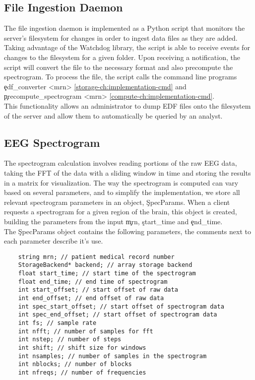 \subsection{File Ingestion Daemon}

The file ingestion daemon is implemented as a Python script that monitors the
server's filesystem for changes in order to ingest data files as they are
added. Taking advantage of the Watchdog \cite{watchdog} library, the script is
able to receive events for changes to the filesystem for a given folder. Upon
receiving a notification, the script will convert the file to the necessary
format and also precompute the spectrogram. To process the file, the script
calls the command line programs \c{edf\_converter <mrn>}
\ref{storage-ch:implementation-cmd} and \c{precompute\_spectrogram <mrn>}
\ref{compute-ch:implementation-cmd}. \\

This functionality allows an administrator to dump EDF files onto the
filesystem of the server and allow them to automatically be queried by an
analyst.

\subsection{EEG Spectrogram}\label{compute-ch:implementation-spectrogram}

The spectrogram calculation involves reading portions of the raw EEG data,
taking the FFT of the data with a sliding window in time and storing the
results in a matrix for visualization. The way the spectrogram is computed can
vary based on several parameters, and to simplify the implementation, we store
all relevant spectrogram parameters in an object, \c{SpecParams}. When a client
requests a spectrogram for a given region of the brain, this object is created,
building the parameters from the input \c{mrn}, \c{start\_time} and
\c{end\_time}. \\

The \c{SpecParams} object contains the following parameters, the comments next
to each parameter describe it's use.

\begin{lstlisting}
    string mrn; // patient medical record number
    StorageBackend* backend; // array storage backend
    float start_time; // start time of the spectrogram
    float end_time; // end time of spectrogram
    int start_offset; // start offset of raw data
    int end_offset; // end offset of raw data
    int spec_start_offset; // start offset of spectrogram data
    int spec_end_offset; // start offset of spectrogram data
    int fs; // sample rate
    int nfft; // number of samples for fft
    int nstep; // number of steps
    int shift; // shift size for windows
    int nsamples; // number of samples in the spectrogram
    int nblocks; // number of blocks
    int nfreqs; // number of frequencies
\end{lstlisting}

